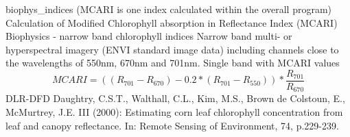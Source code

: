 %
{ %
biophys\_indices (MCARI is one index calculated within the overall program)
}
%
{ %
Calculation of Modified Chlorophyll absorption in Reflectance Index (MCARI)
}
%
{ %
Biophysics - narrow band chlorophyll indices
}
%
{ %
Narrow band multi- or hyperspectral imagery (ENVI standard image data) including channels close to the wavelengths of 550nm, 670nm and 701nm.\bigskip
}
%
{ %
Single band with MCARI values
}
%
{ %
\begin{displaymath}
MCARI = ((R_{701}-R_{670})-0.2*(R_{701}-R_{550}))*\frac{R_{701}}{R_{670}}
\end{displaymath}
}
%
{ %
DLR-DFD
}
%
{ %
Daughtry, C.S.T., Walthall, C.L., Kim, M.S., Brown de Colstoun, E., McMurtrey, J.E. III (2000): Estimating corn leaf chlorophyll concentration from leaf and canopy reflectance. In: Remote Sensing of Environment, 74, p.229-239.
}


